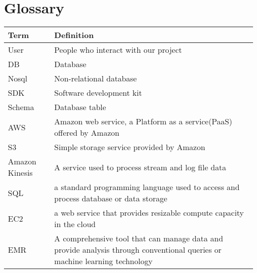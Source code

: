 \section{Glossary}
\begin{tabu} to 
        \hline
        \textbf{Term} & \textbf{Definition}\\
        \hline
        User & People who interact with our project \\
        \hline
        DB & Database\\
        \hline
        Nosql & Non-relational database\\
        \hline
        SDK & Software development kit\\
         \hline
        Schema & Database table \\
        \hline
        AWS & Amazon web service, a Platform as a service(PaaS) offered by Amazon \\
        \hline
        S3 & Simple storage service provided by Amazon\\
        \hline
        Amazon Kinesis & A service used to process stream and log file data \\
        \hline
        SQL & a standard programming language used to access and process database or data storage\\
        \hline
        EC2 & a web service that provides resizable compute capacity in the cloud\cite{g1}\\
        \hline
        EMR & A comprehensive tool that can manage data and provide analysis through conventional queries or machine learning technology\\
		\hline
\end{tabu}